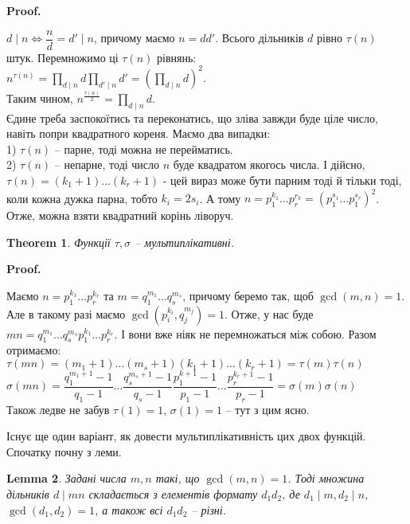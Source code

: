 \documentclass[a4paper, 14pt]{extarticle}
\makeatletter
\theoremstyle{theoremdd}
\newtheorem{theorem}{Theorem}[subsection]
\theoremstyle{theoremdd}
\theoremstyle{theoremdd}
\theoremstyle{theoremdd}
\theoremstyle{theoremdd}
\theoremstyle{theoremdd}
\theoremstyle{theoremdd}
\newtheorem{lemma}[theorem]{Lemma}
\theoremstyle{theoremdd}
\def\qed{$\blacksquare$}
\renewenvironment{proof}[1][Proof.\\]{\par
\pushQED{\hfill \qed}%
\normalfont \topsep6\p@\@plus6\p@\relax
\trivlist
\item\relax
{\bfseries
#1\@addpunct{.}}\hspace\labelsep\ignorespaces
}{%
\popQED\endtrivlist\@endpefalse
}
\makeatother
\begin{document}
\begin{proof}
$d \mid n \iff \dfrac{n}{d} = d' \mid n$, причому маємо $n = dd'$. Всього дільників $d$ рівно $\tau(n)$ штук. Перемножимо ці $\tau(n)$ рівнянь:\\
$n^{\tau(n)} = \displaystyle\prod_{d \mid n} d \displaystyle\prod_{d' \mid n} d' = \left( \displaystyle\prod_{d \mid n} d \right)^2$.\\
Таким чином, $n^{\frac{\tau(n)}{2}} = \displaystyle\prod_{d \mid n} d$.
\bigskip \\
Єдине треба заспокоїтись та переконатись, що зліва завжди буде ціле число, навіть попри квадратного кореня. Маємо два випадки:\\
1) $\tau(n)$ -- парне, тоді можна не перейматись.\\
2) $\tau(n)$ -- непарне, тоді число $n$ буде квадратом якогось числа. І дійсно, $\tau(n) = (k_1+1) \dots (k_r+1)$ - цей вираз може бути парним тоді й тільки тоді, коли кожна дужка парна, тобто $k_i = 2s_i$. А тому $n = p_1^{k_1} \dots p_r^{r_k} = (p_1^{s_1} \dots p_1^{s_r})^2$. Отже, можна взяти квадратний корінь ліворуч.
\end{proof}

\begin{theorem}
Функції $\tau, \sigma$ -- мультиплікативні.
\end{theorem}

\begin{proof}
Маємо $n = p_1^{k_1} \dots p_r^{k_r}$ та $m = q_1^{m_1} \dots q_s^{m_s}$, причому беремо так, щоб $\gcd(m,n) = 1$. Але в такому разі маємо $\gcd\left(p_i^{k_i},q_j^{m_j}\right) = 1$. Отже, у нас буде $mn = q_1^{m_1} \dots q_s^{m_s} p_1^{k_1} \dots p_r^{k_r}$. І вони вже ніяк не перемножаться між собою. Разом отримаємо:\\
$\tau(mn) = (m_1+1) \dots (m_s+1) (k_1+1) \dots (k_r+1) = \tau(m) \tau(n)$\\
$\sigma(mn) = \dfrac{q_1^{m_1+1}-1}{q_1-1} \dots \dfrac{q_s^{m_s+1}-1}{q_s-1} \dfrac{p_1^{k+1}-1}{p_1-1} \dots \dfrac{p_r^{k_r+1}-1}{p_r-1} = \sigma(m) \sigma(n)$
\bigskip \\
Також ледве не забув $\tau(1) = 1$, $\sigma(1) = 1$ -- тут з цим ясно.
\end{proof}

Існує ще один варіант, як довести мультиплікативність цих двох функцій. Спочатку почну з леми.

\begin{lemma}
\label{set of divisors with gcd(m,n) = 1}
Задані числа $m,n$ такі, що $\gcd(m,n) = 1$. Тоді множина дільників $d \mid  mn$ складається з елементів формату $d_1d_2$, де $d_1 \mid m, d_2 \mid n$, $\gcd(d_1,d_2) = 1$, а також всі $d_1d_2$ -- різні.
\end{lemma}
\end{document}
